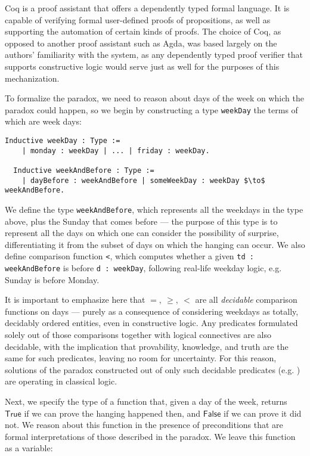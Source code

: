 \documentclass[runningheads]{llncs}
\begin{document}
Coq is a proof assistant that offers a dependently typed formal language.
It is capable of verifying formal user-defined proofs of propositions, as well as supporting
the automation of certain kinds of proofs. The choice of Coq, as opposed to another
proof assistant such as Agda, was based largely on the authors' familiarity with the system,
as any dependently typed proof verifier that supports constructive logic
would serve just as well for the purposes of this mechanization.

To formalize the paradox, we need to reason about days of the week on which
the paradox could happen, so we
begin by constructing a type {\tt weekDay} the terms of which are week days:

\begin{lstlisting}[mathescape=true]
  Inductive weekDay : Type :=
    | monday : weekDay | ... | friday : weekDay.

  Inductive weekAndBefore : Type :=
    | dayBefore : weekAndBefore | someWeekDay : weekDay $\to$ weekAndBefore.
\end{lstlisting}

We define the type {\tt weekAndBefore}, which represents all the weekdays in
the type above, plus the Sunday that comes before --- the purpose of this type is to
represent all the days on which one can consider the possibility of surprise,
differentiating it from the subset of days on which the hanging can occur. We
also define comparison function {\tt <}, which computes
whether a given {\tt td : weekAndBefore} is before {\tt d : weekDay},
following real-life weekday logic, e.g. Sunday is before Monday.

It is important to emphasize here that $=,~\geq,~<$ are all \emph{decidable}
comparison functions on days --- purely as a consequence of considering weekdays
as totally, decidably ordered entities, even in constructive logic. Any predicates
formulated solely out of those comparisons together with logical connectives are also decidable,
with the implication that provability, knowledge, and truth are the same for such predicates,
leaving no room for uncertainty.
For this reason, solutions of the paradox constructed out of only such decidable
predicates (e.g. \cite{godelinconsistent})
are operating in classical logic.

Next, we specify the type of a
function that, given a day of the week, returns $\mathsf{True}$ if we can prove the hanging
happened then, and $\mathsf{False}$ if we can prove it did not. We reason about this function
in the presence of preconditions that are formal interpretations of those described
in the paradox. We leave this function as a variable:
\end{document}
